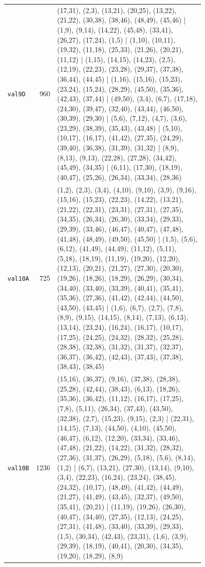 \begin{landscape}
\begin{longtable}{lr>{\tiny\raggedright\arraybackslash}p{0.78\linewidth}}
\texttt{val9D} & 960 & (17,31), (2,3), (13,21), (20,25), (13,22), (21,22), (30,38), (38,46), (48,49), (45,46) | (1,9), (9,14), (14,22), (45,48), (33,41), (26,27), (17,24), (1,5) | (1,10), (10,11), (19,32), (11,18), (25,33), (21,26), (20,21), (11,12) | (1,15), (14,15), (14,23), (2,5), (12,19), (22,23), (23,28), (29,37), (37,38), (36,44), (44,45) | (1,16), (15,16), (15,23), (23,24), (15,24), (28,29), (45,50), (35,36), (42,43), (37,44) | (49,50), (3,4), (6,7), (17,18), (24,30), (39,47), (32,40), (43,44), (46,50), (30,39), (29,30) | (5,6), (7,12), (4,7), (3,6), (23,29), (38,39), (35,43), (43,48) | (5,10), (10,17), (16,17), (41,42), (27,35), (24,29), (39,40), (36,38), (31,39), (31,32) | (8,9), (8,13), (9,13), (22,28), (27,28), (34,42), (45,49), (34,35) | (6,11), (17,30), (18,19), (40,47), (25,26), (26,34), (33,34), (28,36) \\[2pt]
\texttt{val10A} & 725 & (1,2), (2,3), (3,4), (4,10), (9,10), (3,9), (9,16), (15,16), (15,23), (22,23), (14,22), (13,21), (21,22), (22,31), (23,31), (27,31), (27,35), (34,35), (26,34), (26,30), (33,34), (29,33), (29,39), (33,46), (46,47), (40,47), (47,48), (41,48), (48,49), (49,50), (45,50) | (1,5), (5,6), (6,12), (41,49), (44,49), (11,12), (5,11), (5,18), (18,19), (11,19), (19,20), (12,20), (12,13), (20,21), (21,27), (27,30), (20,30), (19,26), (18,26), (18,29), (26,29), (30,34), (34,40), (33,40), (33,39), (40,41), (35,41), (35,36), (27,36), (41,42), (42,44), (44,50), (43,50), (43,45) | (1,6), (6,7), (2,7), (7,8), (8,9), (9,15), (14,15), (8,14), (7,13), (6,13), (13,14), (23,24), (16,24), (16,17), (10,17), (17,25), (24,25), (24,32), (28,32), (25,28), (28,38), (32,38), (31,32), (31,37), (32,37), (36,37), (36,42), (42,43), (37,43), (37,38), (38,43), (38,45) \\[2pt]
\texttt{val10B} & 1236 & (15,16), (36,37), (9,16), (37,38), (28,38), (25,28), (42,44), (38,43), (6,13), (18,26), (35,36), (36,42), (11,12), (16,17), (17,25), (7,8), (5,11), (26,34), (37,43), (43,50), (32,38), (2,7), (15,23), (9,15), (2,3) | (22,31), (14,15), (7,13), (44,50), (4,10), (45,50), (46,47), (6,12), (12,20), (33,34), (33,46), (47,48), (21,22), (14,22), (31,32), (28,32), (27,36), (31,37), (26,29), (5,18), (5,6), (8,14), (1,2) | (6,7), (13,21), (27,30), (13,14), (9,10), (3,4), (22,23), (16,24), (23,24), (38,45), (24,32), (10,17), (48,49), (41,42), (44,49), (21,27), (41,49), (43,45), (32,37), (49,50), (35,41), (20,21) | (11,19), (19,26), (26,30), (40,47), (34,40), (27,35), (12,13), (24,25), (27,31), (41,48), (33,40), (33,39), (29,33), (1,5), (30,34), (42,43), (23,31), (1,6), (3,9), (29,39), (18,19), (40,41), (20,30), (34,35), (19,20), (18,29), (8,9) \\[2pt]

\end{longtable}
\end{landscape}
